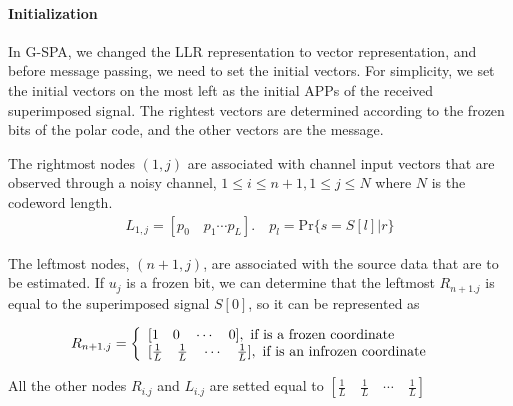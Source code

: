 \paragraph{Initialization}
	
	In G-SPA, we changed the LLR representation to vector representation, and before message passing, we need to set the initial vectors. For simplicity, we set the initial vectors on the most left as the initial APPs of the received superimposed signal. The rightest vectors are determined according to the frozen bits of the polar code, and the other vectors are the message.

The rightmost nodes $(1, j)$ are associated with channel input vectors that are observed through a noisy channel, $1 \leq i \leq n+1, 1 \leq j \leq N$ where $N$ is the codeword length. 
\begin{align}
L_{1,j} = [p_0 \quad p_1 \cdots p_L]. \quad p_l = \text{Pr}\{s=S[l]|r\}
\end{align}

The leftmost nodes, $(n+1, j)$, are associated with the source data that are to be estimated. If $u_j$ is a frozen bit, we can determine that the leftmost $R_{n+1.j}$ is equal to the superimposed signal $S[0]$, so it can be represented as


\begin{equation}
R_{n+1.j}
\nonumber \\ = 
\left\{
             \begin{array}{lr}
             { [1 \quad 0 \quad \cdots \quad 0] }, \ \text{if  is a frozen coordinate} &  \\
           { [ \frac{1}{L} \quad \frac{1}{L} \quad \cdots \quad \frac{1}{L} ] },  \ \text{if  is an infrozen coordinate}& \\ 
             \end{array}
\right.
\end{equation}

All the other nodes $R_{i.j}$ and $L_{i.j}$ are setted equal to $[\frac{1}{L} \quad \frac{1}{L} \quad \cdots \quad \frac{1}{L}]$ 


